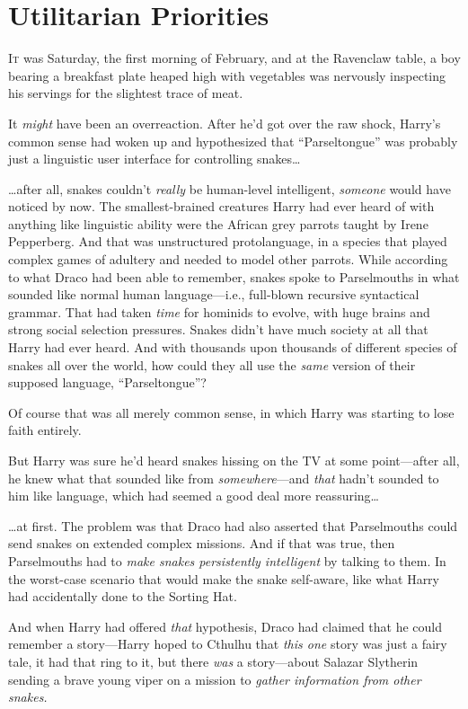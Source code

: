 \chapter{Utilitarian Priorities}

\lettrine{I}{t} was Saturday,
the first morning of February, and at the Ravenclaw table, a boy bearing a breakfast plate heaped high with vegetables was nervously inspecting his servings for the slightest trace of meat.

It \emph{might} have been an overreaction. After he’d got over the raw shock, Harry’s common sense had woken up and hypothesized that “Parseltongue” was probably just a linguistic user interface for controlling snakes…

…after all, snakes couldn’t \emph{really} be human-level intelligent, \emph{someone} would have noticed by now. The smallest-brained creatures Harry had ever heard of with anything like linguistic ability were the African grey parrots taught by Irene Pepperberg. And that was unstructured protolanguage, in a species that played complex games of adultery and needed to model other parrots. While according to what Draco had been able to remember, snakes spoke to Parselmouths in what sounded like normal human language—i.e., full-blown recursive syntactical grammar. That had taken \emph{time} for hominids to evolve, with huge brains and strong social selection pressures. Snakes didn’t have much society at all that Harry had ever heard. And with thousands upon thousands of different species of snakes all over the world, how could they all use the \emph{same} version of their supposed language, “Parseltongue”?

Of course that was all merely common sense, in which Harry was starting to lose faith entirely.

But Harry was sure he’d heard snakes hissing on the TV at some point—after all, he knew what that sounded like from \emph{somewhere}—and \emph{that} hadn’t sounded to him like language, which had seemed a good deal more reassuring…

…at first. The problem was that Draco had also asserted that
Parselmouths could send snakes on extended complex missions. And if that was true, then Parselmouths had to \emph{make snakes persistently intelligent} by talking to them. In the worst-case scenario that would make the snake self-aware, like what Harry had accidentally done to the Sorting Hat.

And when Harry had offered \emph{that} hypothesis, Draco had claimed that he could remember a story—Harry hoped to Cthulhu that \emph{this one} story was just a fairy tale, it had that ring to it, but there \emph{was} a story—about Salazar Slytherin sending a brave young viper on a mission to \emph{gather information from other snakes.}

